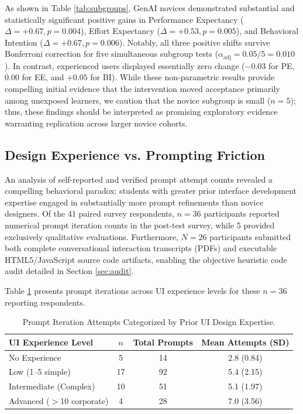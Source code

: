 \documentclass{cleiej}
\begin{document}
As shown in Table \ref{tab:subgroups}, GenAI novices demonstrated substantial and statistically significant positive gains in Performance Expectancy ($\Delta = +0.67, p = 0.004$), Effort Expectancy ($\Delta = +0.53, p = 0.005$), and Behavioral Intention ($\Delta = +0.67, p = 0.006$). Notably, all three positive shifts survive Bonferroni correction for five simultaneous subgroup tests ($\alpha_{\text{adj}} = 0.05 / 5 = 0.010$). In contrast, experienced users displayed essentially zero change ($-0.03$ for PE, $0.00$ for EE, and $+0.05$ for BI). While these non-parametric results provide compelling initial evidence that the intervention moved acceptance primarily among unexposed learners, we caution that the novice subgroup is small ($n = 5$); thus, these findings should be interpreted as promising exploratory evidence warranting replication across larger novice cohorts.

\subsection{Design Experience vs. Prompting Friction}
An analysis of self-reported and verified prompt attempt counts revealed a compelling behavioral paradox: students with greater prior interface development expertise engaged in substantially more prompt refinements than novice designers. Of the 41 paired survey respondents, $n = 36$ participants reported numerical prompt iteration counts in the post-test survey, while 5 provided exclusively qualitative evaluations. Furthermore, $N = 26$ participants submitted both complete conversational interaction transcripts (PDFs) and executable HTML5/JavaScript source code artifacts, enabling the objective heuristic code audit detailed in Section \ref{sec:audit}.

Table \ref{tab:prompt_exp} presents prompt iterations across UI experience levels for these $n = 36$ reporting respondents.

\begin{table}[ht]
\centering
\caption{Prompt Iteration Attempts Categorized by Prior UI Design Expertise.}
\label{tab:prompt_exp}
\begin{tabular}{lccc}
\toprule
\textbf{UI Experience Level} & \textbf{$n$} & \textbf{Total Prompts} & \textbf{Mean Attempts (SD)} \\
\midrule
No Experience          & 5  & 14 & 2.8 (0.84) \\
Low (1--5 simple)      & 17 & 92 & 5.4 (2.15) \\
Intermediate (Complex) & 10 & 51 & 5.1 (1.97) \\
Advanced ($>$10 corporate)& 4 & 28 & 7.0 (3.56) \\
\bottomrule
\end{tabular}
\end{table}
\end{document}
